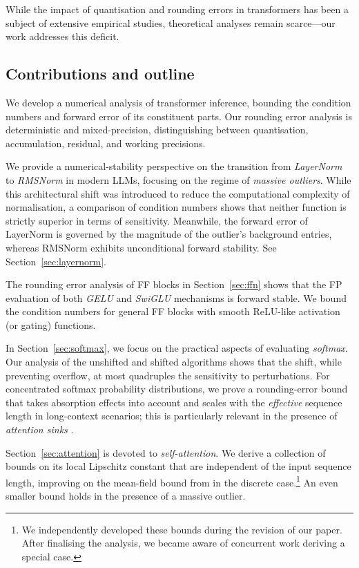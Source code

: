\documentclass[namedate,webpdf,imanum]{ima-authoring-template}
\numberwithin{equation}{section}
\begin{document}
While the impact of quantisation and rounding errors in transformers has been a subject of extensive empirical studies, theoretical analyses remain scarce---our work addresses this deficit.

\subsection{Contributions and outline}
We develop a numerical analysis of transformer inference, bounding the condition numbers and forward error of its constituent parts.
Our rounding error analysis is deterministic \citep{higham2002accuracy} and mixed-precision, distinguishing between quantisation, accumulation, residual, and working precisions.

We provide a numerical-stability perspective on the transition from \emph{LayerNorm} \citep{ba2016layer} to \emph{RMSNorm} \citep{zhang2019root} in modern LLMs, focusing on the regime of \emph{massive outliers}.
While this architectural shift was introduced to reduce the computational complexity of normalisation, a comparison of condition numbers shows that neither function is strictly superior in terms of sensitivity.
Meanwhile, the forward error of LayerNorm is governed by the magnitude of the outlier's background entries, whereas RMSNorm exhibits unconditional forward stability.
See Section~\ref{sec:layernorm}.

The rounding error analysis of FF blocks in Section~\ref{sec:ffn} shows that the FP evaluation of both \emph{GELU} \citep{hendrycks2016gaussian} and \emph{SwiGLU} \citep{shazeer2020glu} mechanisms is forward stable.
We bound the condition numbers for general FF blocks with smooth ReLU-like activation (or gating) functions.

In Section~\ref{sec:softmax}, we focus on the practical aspects of evaluating \emph{softmax}.
Our analysis of the unshifted and shifted algorithms shows that the shift, while preventing overflow, at most quadruples the sensitivity to perturbations.
For concentrated softmax probability distributions, we prove a rounding-error bound that takes absorption effects into account and scales with the \emph{effective} sequence length in long-context scenarios; this is particularly relevant in the presence of \emph{attention sinks} \citep{xiao2024efficient}.

Section~\ref{sec:attention} is devoted to \emph{self-attention}.
We derive a collection of bounds on its local Lipschitz constant that are independent of the input sequence length, improving on the mean-field bound from \cite{castin2024smooth} in the discrete case.\footnote{We independently developed these bounds during the revision of our paper. After finalising the analysis, we became aware of concurrent work \cite{emadi2026exact} deriving a special case.}
An even smaller bound holds in the presence of a massive outlier.
\end{document}
